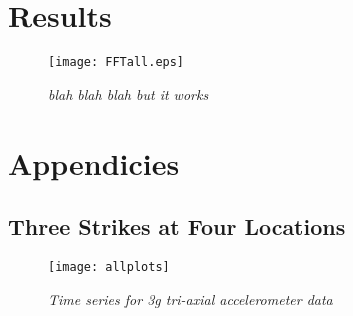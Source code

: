 \documentclass[12pt]{report}
\begin{document}
\chapter{Results}
\begin{figure}[H]
\centering
\texttt{[image: FFTall.eps]}
\caption{\textit{blah blah blah but it works}}
\label{fig:FFTall}
\end{figure}

\chapter{Appendicies}
\appendix
\section{Three Strikes at Four Locations}
\begin{figure}[h]
\centering
\texttt{[image: allplots]}
\caption{\textit{Time series for 3g tri-axial accelerometer data}}
\label{app:RES_3g_T_ALL}
\end{figure}
\end{document}
